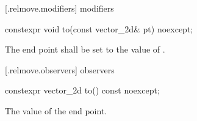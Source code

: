  [\iotwod.relmove.modifiers]{ modifiers}

\begin{itemdecl}
constexpr void to(const vector_2d& pt) noexcept;
\end{itemdecl}
\begin{itemdescr}
\pnum
\effects
The end point shall be set to the value of .
\end{itemdescr}

 [\iotwod.relmove.observers]{ observers}

\begin{itemdecl}
constexpr vector_2d to() const noexcept;
\end{itemdecl}
\begin{itemdescr}
\pnum
\returns
The value of the end point.
\end{itemdescr}
